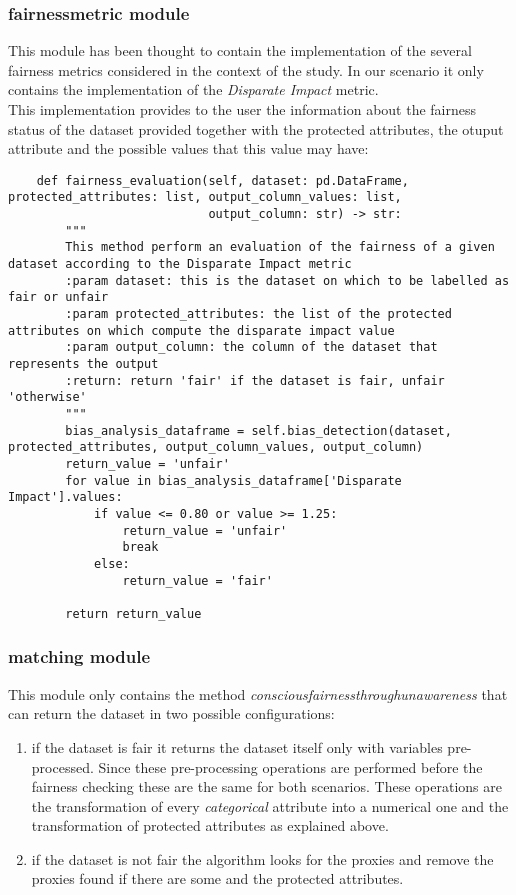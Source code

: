 \documentclass[12pt,a4paper,openright,twoside]{book}
\begin{document}
\subsubsection{fairness\textunderscore metric module}
This module has been thought to contain the implementation of the several fairness metrics considered in the context of the study. In our scenario it only contains the implementation of the \emph{Disparate Impact} metric. \\
This implementation provides to the user the information about the fairness status of the dataset provided together with the protected attributes, the otuput attribute and the possible values that this value may have: \\
\begin{lstlisting}
    def fairness_evaluation(self, dataset: pd.DataFrame, protected_attributes: list, output_column_values: list,
                            output_column: str) -> str:
        """
        This method perform an evaluation of the fairness of a given dataset according to the Disparate Impact metric
        :param dataset: this is the dataset on which to be labelled as fair or unfair
        :param protected_attributes: the list of the protected attributes on which compute the disparate impact value
        :param output_column: the column of the dataset that represents the output
        :return: return 'fair' if the dataset is fair, unfair 'otherwise'
        """
        bias_analysis_dataframe = self.bias_detection(dataset, protected_attributes, output_column_values, output_column)
        return_value = 'unfair'
        for value in bias_analysis_dataframe['Disparate Impact'].values:
            if value <= 0.80 or value >= 1.25:
                return_value = 'unfair'
                break
            else:
                return_value = 'fair'

        return return_value
\end{lstlisting}


\subsubsection{matching module}
This module only contains the method \emph{conscious\textunderscore fairness\textunderscore through\textunderscore unawareness} that can return the dataset in two possible configurations:
\begin{enumerate}
    \item if the dataset is fair it returns the dataset itself only with variables pre-processed. Since these pre-processing operations are performed before the fairness checking these are the same for both scenarios. These operations are the transformation of every \emph{categorical} attribute into a numerical one and the transformation of protected attributes as explained above.
    \item if the dataset is not fair the algorithm looks for the proxies and remove the proxies found if there are some and the protected attributes.
\end{enumerate}
\end{document}
